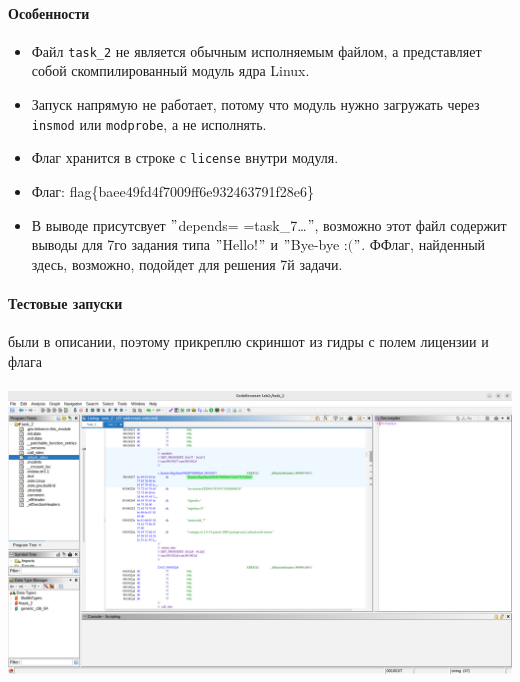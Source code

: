 \vspace{0.5cm}

\noindent

\paragraph{Особенности}
\begin{itemize}
    \item Файл \texttt{task\_2} не является обычным исполняемым файлом, а представляет собой скомпилированный модуль ядра Linux.
    \item Запуск напрямую не работает, потому что модуль нужно загружать через \texttt{insmod} или \texttt{modprobe}, а не исполнять.
    \item Флаг хранится в строке с \texttt{license} внутри модуля.
    \item Флаг: flag\{baee49fd4f7009ff6e932463791f28e6\}
    \item В выводе присутсвует \("\)depends= \ldotsname=task\_7\ldots\("\), возможно этот файл содержит выводы для
    7го задания типа \("\)Hello!\("\) и \("\)Bye-bye :$($\("\).
    ФФлаг, найденный здесь, возможно, подойдет для решения 7й задачи.
\end{itemize}

\paragraph{Тестовые запуски} были в описании, поэтому прикреплю скриншот из гидры с полем лицензии и флага

\paragraph{}
\includegraphics[width=1\linewidth]{static/solution_task_2}
